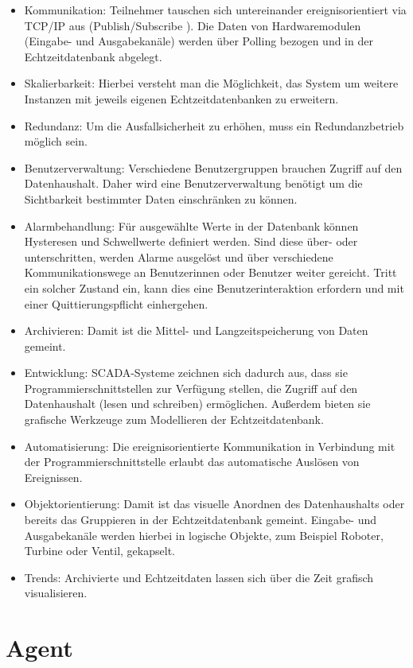\begin{itemize}
	\item Kommunikation: Teilnehmer tauschen sich untereinander ereignisorientiert via TCP/IP aus (Publish/Subscribe \cite{Jacobsen2009}). Die Daten von Hardwaremodulen (Eingabe- und Ausgabekanäle) werden über Polling bezogen und in der Echtzeitdatenbank abgelegt.
	\item Skalierbarkeit: Hierbei versteht man die Möglichkeit, das System um weitere Instanzen mit jeweils eigenen Echtzeitdatenbanken zu erweitern.
	\item Redundanz: Um die Ausfallsicherheit zu erhöhen, muss ein Redundanzbetrieb möglich sein.
	\item Benutzerverwaltung: Verschiedene Benutzergruppen brauchen Zugriff auf den Datenhaushalt. Daher wird eine Benutzerverwaltung benötigt um die Sichtbarkeit bestimmter Daten einschränken zu können.
	\item Alarmbehandlung: Für ausgewählte Werte in der Datenbank können Hysteresen und Schwellwerte definiert werden. Sind diese über- oder unterschritten, werden Alarme ausgelöst und über verschiedene Kommunikationswege an Benutzerinnen oder Benutzer weiter gereicht. Tritt ein solcher Zustand ein, kann dies eine Benutzerinteraktion erfordern und mit einer Quittierungspflicht einhergehen.  
	\item Archivieren: Damit ist die Mittel- und Langzeitspeicherung von Daten gemeint.
	\item Entwicklung: SCADA-Systeme zeichnen sich dadurch aus, dass sie Programmierschnittstellen zur Verfügung stellen, die Zugriff auf den Datenhaushalt (lesen und schreiben) ermöglichen. Außerdem bieten sie grafische Werkzeuge zum Modellieren der Echtzeitdatenbank.
	\item Automatisierung: Die ereignisorientierte Kommunikation in Verbindung mit der Programmierschnittstelle erlaubt das automatische Auslösen von Ereignissen.
	\item Objektorientierung: Damit ist das visuelle Anordnen des Datenhaushalts oder bereits das Gruppieren in der Echtzeitdatenbank gemeint. Eingabe- und Ausgabekanäle werden hierbei in logische Objekte, zum Beispiel Roboter, Turbine oder Ventil, gekapselt.
	\item Trends: Archivierte und Echtzeitdaten lassen sich über die Zeit grafisch visualisieren.\\
\end{itemize}

\section{Agent}

